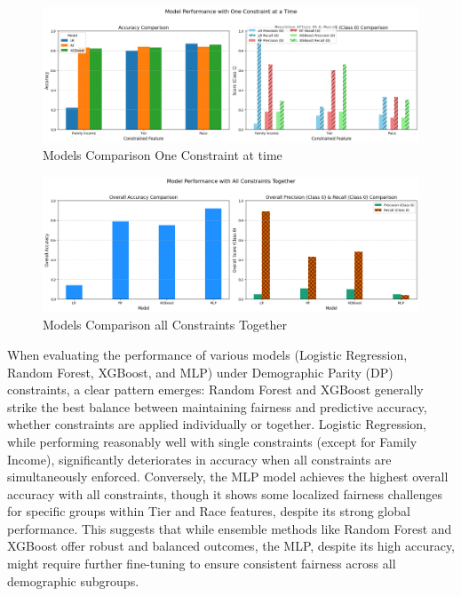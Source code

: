 \documentclass{article}
\begin{document}
\begin{figure}[h!]
      \centering
      \includegraphics[width=1\textwidth]{models_comp_one_at_time.png} 
      \caption{Models Comparison One Constraint at time}
      \label{fig:example}
    \end{figure}
\begin{figure}[h!]
      \centering
      \includegraphics[width=1\textwidth]{model_cons_all_tog.png} 
      \caption{Models Comparison all Constraints Together}
      \label{fig:example}
    \end{figure}

When evaluating the performance of various models (Logistic Regression, Random Forest, XGBoost, and MLP) under Demographic Parity (DP) constraints, a clear pattern emerges: Random Forest and XGBoost generally strike the best balance between maintaining fairness and predictive accuracy, whether constraints are applied individually or together. Logistic Regression, while performing reasonably well with single constraints (except for Family Income), significantly deteriorates in accuracy when all constraints are simultaneously enforced. Conversely, the MLP model achieves the highest overall accuracy with all constraints, though it shows some localized fairness challenges for specific groups within Tier and Race features, despite its strong global performance. This suggests that while ensemble methods like Random Forest and XGBoost offer robust and balanced outcomes, the MLP, despite its high accuracy, might require further fine-tuning to ensure consistent fairness across all demographic subgroups.
\end{document}
